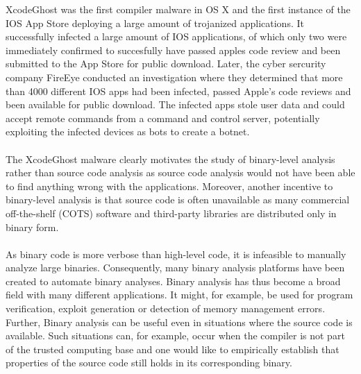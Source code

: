 \documentclass{kththesis}
\begin{document}
XcodeGhost was the first compiler malware in OS X and the first instance of the IOS App Store deploying a large amount of trojanized applications\cite{XcodeGhost}\cite{XcodeGhostFireEye}. It successfully infected a large amount of IOS applications, of which only two were immediately confirmed to succesfully have passed apples code review and been submitted to the App Store for public download\cite{XcodeGhost}. Later, the cyber sercurity company FireEye conducted an investigation where they determined that more than 4000 different IOS apps had been infected, passed Apple's code reviews and been available for public download. The infected apps stole user data and could accept remote commands from a command and control server\cite{XcodeGhostFireEye}, potentially exploiting the infected devices as bots to create a botnet.
\\ \\
The XcodeGhost malware clearly motivates the study of binary-level analysis rather than source code analysis as source code analysis would not have been able to find anything wrong with the applications. Moreover, another incentive to binary-level analysis is that source code is often unavailable as many commercial off-the-shelf (COTS) software and third-party libraries are distributed only in binary form\cite{preciseCFG}.
\\ \\
As binary code is more verbose than high-level code, it is infeasible to manually analyze large binaries. Consequently, many binary analysis platforms have been created to automate binary analyses\cite{BitBlaze}\cite{BAP}\cite{TrABin}\cite{CodeSurfer}. Binary analysis has thus become a broad field with many different applications. It might, for example, be used for program verification\cite{TrABin}, exploit generation\cite{angr} or detection of memory management errors\cite{valgrind}. Further, Binary analysis can be useful even in situations where the source code is available. Such situations can, for example, occur when the compiler is not part of the trusted computing base and one would like to empirically establish that properties of the source code still holds in its corresponding binary.
\end{document}
